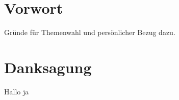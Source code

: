 \documentclass[12pt]{scrartcl}
\begin{document}
\section*{Vorwort}
\label{sec:vorwort}
Gründe für Themenwahl und persönlicher Bezug dazu.

\newpage
	\tableofcontents
\newpage

\section*{Danksagung}
\label{sec:danksagung}

	
	
	
	
	
	
	
	
	
Hallo \textcite{test} ja
\printbibliography
	
\end{document}
